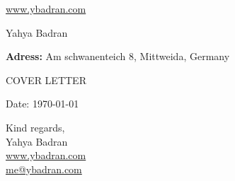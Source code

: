 \documentclass[11pt,a4]{article}
\begin{document}
\begin{center}
    \begin{minipage}[b]{0.34\textwidth}
            \large \url{www.ybadran.com} \\
    \end{minipage}%
    \begin{minipage}[b]{0.3\textwidth}
            \centering
            {\Huge Yahya Badran} \\ %
            \vspace{0.1cm}
            {\color{UI_blue} \Large{}}%
    \end{minipage}%
    \begin{minipage}[b]{0.34\textwidth}
            \flushright \large
            {\textbf{Adress:} Am schwanenteich 8, Mittweida, Germany} \\
            
    \end{minipage}   
    
\vspace{-0.15cm} 
{\color{UI_blue} \hrulefill}
\end{center}

\justify
\setlength{\parindent}{0pt}
\setlength{\parskip}{12pt}
\vspace{0.2cm}
\begin{center}
    {\color{UI_blue} \Large{COVER LETTER}}
\end{center}



Date: \today \par \vspace{-0.1cm}


 
\vspace{0.5cm}
\raggedright
Kind regards, \\ Yahya Badran \\ \href{https://www.ybadran.com}{www.ybadran.com} \\ \href{mailto:me@ybadran.com}{me@ybadran.com}
\end{document}
